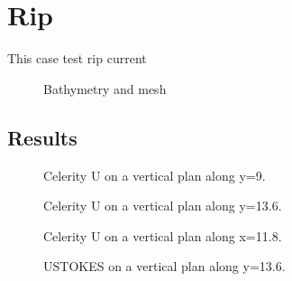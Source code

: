 \chapter{Rip}
This case test rip current
\begin{figure} [!h]
\centering
{}
 \caption{Bathymetry and mesh}
\label{figresRip0}
\end{figure}

\section{Results}
\begin{figure} [!h]
\centering
{}
 \caption{Celerity U on a vertical plan along y=9.}
\label{figresRip1}
\end{figure}
\begin{figure} [!h]
\centering
{}
 \caption{Celerity U on a vertical plan along y=13.6.}
\label{figresRip2}
\end{figure}
\begin{figure} [!h]
\centering
{}
 \caption{Celerity U on a vertical plan along x=11.8.}
\label{figresRip3}
\end{figure}
\begin{figure} [!h]
\centering
{}
 \caption{USTOKES on a vertical plan along y=13.6.}
\label{figresRip4}
\end{figure}


